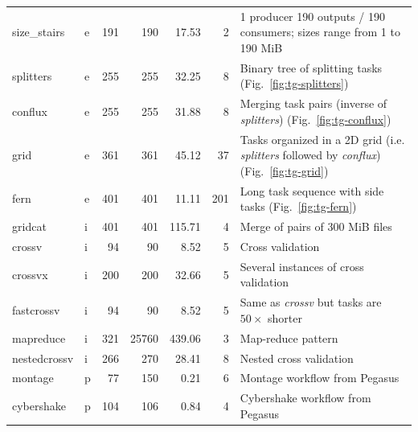 \begin{table}[h]
\begin{tabular}{l|lrrrr|T}
        size\_stairs     & e & 191 & 190   & 17.53  & 2   & 1 producer 190
        outputs / 190 consumers; sizes range from 1 to 190 MiB                           \\
        splitters        & e & 255 & 255   & 32.25  & 8   & Binary tree of
        splitting tasks (Fig.~\ref{fig:tg-splitters})                                    \\
        conflux          & e & 255 & 255   & 31.88  & 8   & Merging task pairs
        (inverse of \emph{splitters}) (Fig.~\ref{fig:tg-conflux})                        \\
        grid             & e & 361 & 361   & 45.12  & 37  & Tasks organized in a 2D grid
        (i.e. \emph{splitters} followed by \emph{conflux}) (Fig.~\ref{fig:tg-grid})
        \\
        fern             & e & 401 & 401   & 11.11  & 201 & Long task sequence with
        side tasks (Fig.~\ref{fig:tg-fern})                                              \\ \hline
        gridcat          & i & 401 & 401   & 115.71 & 4   & Merge of pairs of 300 MiB
        files                                                                            \\
        crossv           & i & 94  & 90    & 8.52   & 5   & Cross validation             \\
        crossvx          & i & 200 & 200   & 32.66  & 5   & Several instances of cross
        validation                                                                       \\
        fastcrossv       & i & 94  & 90    & 8.52   & 5   & Same as \emph{crossv}
        but tasks are $50\times$ shorter                                                 \\
        mapreduce        & i & 321 & 25760 & 439.06 & 3   & Map-reduce pattern           \\
        nestedcrossv     & i & 266 & 270   & 28.41  & 8   & Nested cross
        validation                                                                       \\ \hline
        montage          & p & 77  & 150   & 0.21   & 6   & Montage workflow
        from Pegasus                                                                     \\
        cybershake       & p & 104 & 106   & 0.84   & 4   & Cybershake
        workflow from Pegasus                                                            \\

\end{tabular}
\end{table}
